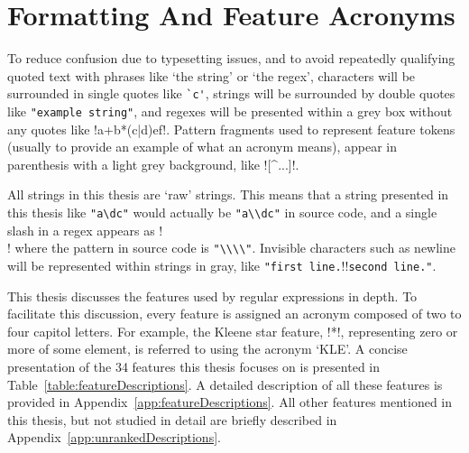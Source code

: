 \section{Formatting And Feature Acronyms}
To reduce confusion due to typesetting issues, and to avoid repeatedly qualifying quoted text with phrases like `the string' or `the regex', characters will be surrounded in single quotes like \verb!`c'!, strings will be surrounded by double quotes like \verb!"example string"!, and regexes will be presented within a grey box without any quotes like \cverb!a+b*(c|d)e\1f!.  Pattern fragments used to represent feature tokens (usually to provide an example of what an acronym means), appear in parenthesis with a light grey background, like \bverb![^...]!.

All strings in this thesis are `raw' strings.  This means that a string presented in this thesis like \verb!"a\dc"! would actually be \verb!"a\\dc"! in source code, and a single slash in a regex appears as \cverb!\\! where the pattern in source code is \verb!"\\\\"!.  Invisible characters such as newline will be represented within strings in gray, like \verb!"first line.!\gverb!\n!\verb!second line."!.

This thesis discusses the features used by regular expressions in depth.  To facilitate this discussion, every feature is assigned an acronym composed of two to four capitol letters.  For example, the Kleene star feature, \bverb!*!, representing zero or more of some element, is referred to using the acronym `KLE'.  A concise presentation of the 34 features this thesis focuses on is presented in Table~\ref{table:featureDescriptions}.  A detailed description of all these features is provided in Appendix~\ref{app:featureDescriptions}.  All other features mentioned in this thesis, but not studied in detail are briefly described in Appendix~\ref{app:unrankedDescriptions}.
